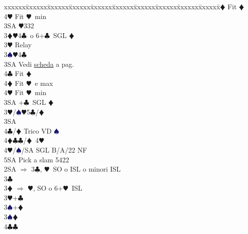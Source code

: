 \documentclass[a4paper,italian]{article}
\newcommand{\BC}{\textcolor{OliveGreen}{$\clubsuit$}}
\newcommand{\BD}{\textcolor{RedOrange}{$\vardiamondsuit$}}
\newcommand{\BH}{\textcolor{Red2}{$\varheartsuit${}}}
\newcommand{\BS}{\textcolor{MidnightBlue}{$\spadesuit${}}}
\newenvironment{bidtable}
{\begin{tabbing}

    xxxxxx\=xxxxxx\=xxxxxx\=xxxxxx\=xxxxxx\=xxxxxx\=xxxxxx\=xxxxxx\=xxxxxx\=xxxxxx\=\kill}
{\end{tabbing} }%
\begin{document}
\begin{multicols}{2}
\begin{bidtable}
                                            4\BD\> Fit \BD\\
                                            4\BH\> Fit \BH\ min\-\\
                                            3SA \BH 332\-\-\\
                                            3\BD {}\BH 4\BC\ o 6+\BC\ SGL \BD \+\\
                                            3\BH \> Relay\+\\
                                            3\BS {}\BH 4\BC\+\\
                                            3SA\> Vedi \hyperref[Riapertura3SA]{scheda} a pag. \pageref{Riapertura3SA}\\
                                            4\BC\> Fit \BD\\
                                            4\BD\> Fit \BH\ e max\\
                                            4\BH\> Fit \BH\ min\-\\
                                            3SA +\BC\ SGL \BD \-\-\\
                                            3\BH/\BS {}\BH 5\BC /\BD \+\\
                                            3SA\+\\
                                            4\BC/\BD \> Trico VD \BS \\
                                            4\BD\BC {}\BC /\BD\ 4\BH \\
                                            4\BH/\BS/SA\> \> SGL B/A/22 NF\\
                                            5SA \> Pick a slam 5422\-\-\-\-\\
                                            2SA \> $\Rightarrow$ 3\BC , \BH\ SO o ISL o minori ISL\+\\
                                            3\BC\+\\
                                            3\BD \> $\Rightarrow$ \BH , SO o 6+\BH\ ISL\\
                                            3\BH {}+\BC \+\\
                                            3\BS {}+\BD \-\\
                                            3\BS {}\BD \+\\
                                            4\BC {}\BC \-\\

\end{bidtable}
\end{multicols}
\end{document}

